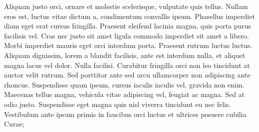 \documentclass[12pt]{hw}
\begin{document}
Aliquam justo orci, ornare et molestie scelerisque, vulputate quis tellus.
Nullam eros est, luctus vitae dictum a, condimentum convallis ipsum.
Phasellus imperdiet diam eget erat cursus fringilla. Praesent eleifend
lacinia magna, quis porta purus facilisis vel. Cras nec justo sit amet
ligula commodo imperdiet sit amet a libero. Morbi imperdiet mauris eget
orci interdum porta. Praesent rutrum luctus luctus. Aliquam dignissim,
lorem a blandit facilisis, ante est interdum nulla, et aliquet magna lacus
vel dolor. Nulla facilisi. Curabitur fringilla orci non leo tincidunt at
auctor velit rutrum. Sed porttitor ante sed arcu ullamcorper non adipiscing
ante rhoncus. Suspendisse quam ipsum, cursus iaculis iaculis vel, gravida
non enim. Maecenas tellus magna, vehicula vitae adipiscing vel, feugiat ac
magna. Sed at odio justo. Suspendisse eget magna quis nisl viverra
tincidunt eu nec felis. Vestibulum ante ipsum primis in faucibus orci
luctus et ultrices posuere cubilia Curae;
\end{document}
